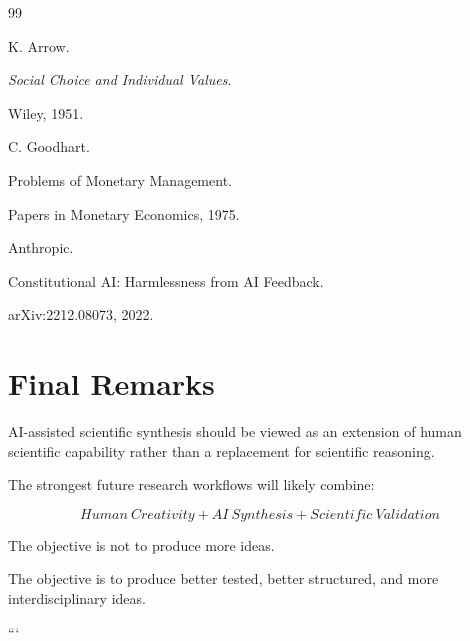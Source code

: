 \documentclass[11pt]{article}
\begin{document}
\begin{thebibliography}{99}

K. Arrow.

\textit{Social Choice and Individual Values}.

Wiley, 1951.




C. Goodhart.

Problems of Monetary Management.

Papers in Monetary Economics, 1975.




Anthropic.

Constitutional AI: Harmlessness from AI Feedback.

arXiv:2212.08073, 2022.



\end{thebibliography}



\section{Final Remarks}


AI-assisted scientific synthesis should be viewed as an extension of
human scientific capability rather than a replacement for scientific
reasoning.


The strongest future research workflows will likely combine:


\[
Human
\ Creativity
+
AI
\ Synthesis
+
Scientific
\ Validation
\]


The objective is not to produce more ideas.

The objective is to produce better tested, better structured, and more
interdisciplinary ideas.


```
\end{document}
